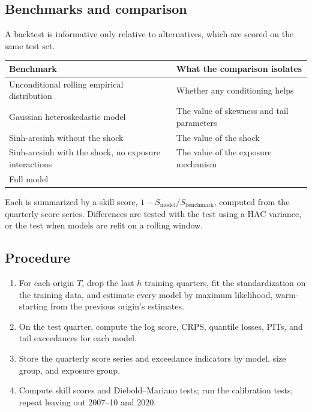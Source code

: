 \documentclass[11pt]{article}
\begin{document}
\subsection{Benchmarks and comparison}

A backtest is informative only relative to alternatives, which are scored on the same test set.

\begin{center}
\begin{tabular}{@{}ll@{}}
\toprule
Benchmark & What the comparison isolates \\
\midrule
Unconditional rolling empirical distribution & Whether any conditioning helps \\
Gaussian heteroskedastic model & The value of skewness and tail parameters \\
Sinh-arcsinh without the shock & The value of the shock \\
Sinh-arcsinh with the shock, no exposure interactions & The value of the exposure mechanism \\
Full model & \\
\bottomrule
\end{tabular}
\end{center}
Each is summarized by a skill score, $1-S_{\text{model}}/S_{\text{benchmark}}$, computed from the quarterly score series. Differences are tested with the \citet{diebold1995} test using a HAC variance, or the \citet{giacomini2006} test when models are refit on a rolling window.

\subsection{Procedure}

\begin{enumerate}
  \item For each origin $T$, drop the last $h$ training quarters, fit the standardization on the training data, and estimate every model by maximum likelihood, warm-starting from the previous origin's estimates.
  \item On the test quarter, compute the log score, CRPS, quantile losses, PITs, and tail exceedances for each model.
  \item Store the quarterly score series and exceedance indicators by model, size group, and exposure group.
  \item Compute skill scores and Diebold--Mariano tests; run the calibration tests; repeat leaving out 2007--10 and 2020.
\end{enumerate}
\end{document}
